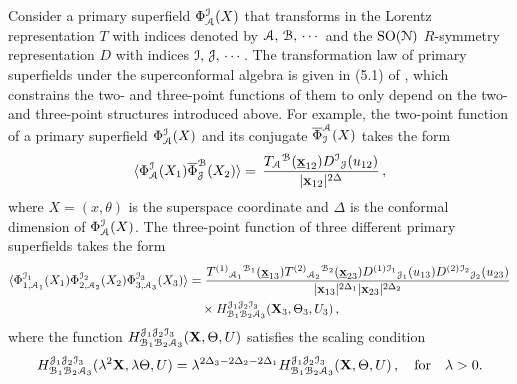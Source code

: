\documentclass[11pt]{article}
\begin{document}
Consider a primary superfield $\Phi^{\cal I}_{\cal A}(X)$ that transforms in the Lorentz representation $T$ with indices denoted by ${\cal A},\,{\cal B},\,\cdots$ and the ${\rm SO}({\cal N})$ $R$-symmetry representation $D$ with indices ${\cal I},\,{\cal J},\,\cdots$. The transformation law of primary superfields under the superconformal algebra is given in (5.1) of \cite{Buchbinder:2015qsa}, which constrains the two- and three-point functions of them to only depend on the two- and three-point structures introduced above. For example, the two-point function of a primary superfield $\Phi^{\cal I}_{\cal A}(X)$ and its conjugate $\overline\Phi_{\cal I}^{\cal A}(X)$ takes the form
%
\begin{equation}\label{eq:generalSUSY2pt}
\langle \Phi^{\cal I}_{\cal A}(X_1) \overline\Phi_{\cal J}^{\cal B}(X_2)\rangle = 
\, \frac{ {T_{\cal A}{}^{\cal B}(\underline{\bf x}_{12})}{D^{\cal I}{}_{\cal J}(u_{12})}}{ |{\bf x}_{12}|^{2\Delta}}\,,
\end{equation}
%
where $X=(x,\theta)$ is the superspace coordinate and $\Delta$ is the conformal dimension of $\Phi^{\cal I}_{\cal A}(X)$. The three-point function of three different primary superfields takes the form
%
\begin{equation}\label{eq:generalSUSY3pt}
\begin{split}
\langle \Phi^{{\cal I}_1}_{1,{\cal A}_1}(X_1)  \Phi^{{\cal I}_2}_{2,{\cal A}_2}(X_2)  \Phi^{{\cal I}_3}_{3,{\cal A}_3}(X_3)\rangle& = 
\frac{T^{(1)}{}_{{\cal A}_1}{}^{{\cal B}_1}(\underline{\bf x}_{13})T^{(2)}{}_{{\cal A}_2}{}^{{\cal B}_2}(\underline{\bf x}_{23})D^{(1)}{}^{{\cal I}_1}{}_{{\cal J}_1}(u_{13})D^{(2)}{}^{{\cal I}_2}{}_{{\cal J}_2}(u_{23})}{ |{\bf x}_{13}|^{2\Delta_1}  |{\bf x}_{23}|^{2\Delta_2} }
\\
&\quad\times H^{{\cal J}_1{\cal J}_2 {\cal I}_3}_{{\cal B}_1{\cal B}_2{\cal A}_3}({\bf X}_3,\Theta_3,U_3)\,,
\end{split}
\end{equation}
%
where the function $H^{{\cal J}_1{\cal J}_2 {\cal I}_3}_{{\cal B}_1{\cal B}_2{\cal A}_3}({\bf X},\Theta,U)$ satisfies the scaling condition
%
\begin{equation}\label{eq:scalingH}
H^{{\cal J}_1{\cal J}_2 {\cal I}_3}_{{\cal B}_1{\cal B}_2{\cal A}_3}(\lambda^2{\bf X},\lambda\Theta,U)=\lambda^{2\Delta_3-2\Delta_2-2\Delta_1}H^{{\cal J}_1{\cal J}_2 {\cal I}_3}_{{\cal B}_1{\cal B}_2{\cal A}_3}({\bf X},\Theta,U)\,,\quad{\rm for}\quad\lambda>0.
\end{equation}
%
\end{document}
